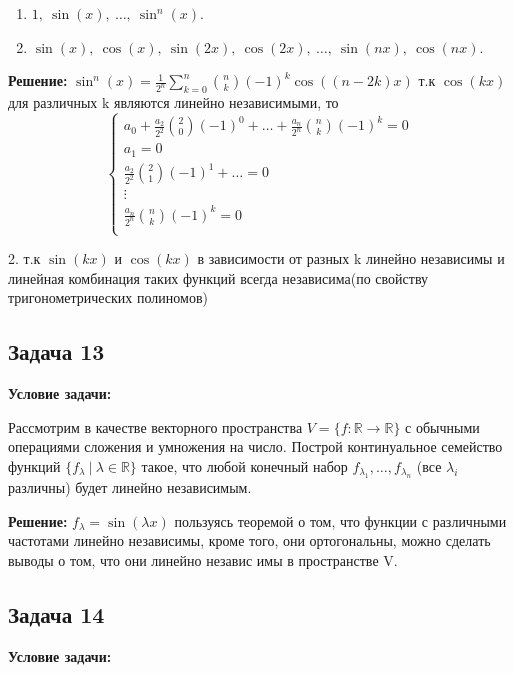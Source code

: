 \documentclass[a4paper,12pt]{article}
\begin{document}
\begin{enumerate}
    \item $1,\ \sin(x),\ \ldots,\ \sin^n(x)$.
    \item $\sin(x),\ \cos(x),\ \sin(2x),\ \cos(2x),\ \ldots,\ \sin(nx),\ \cos(nx)$.
\end{enumerate}
\textbf{Решение: }
$\sin^n(x) = \frac{1}{2^n} \sum_{k=0}^{n} \binom{n}{k} (-1)^k \cos\left((n - 2k)x\right)$
т.к $\cos(kx)$ для различных k являются линейно независимыми, то 
\[
\begin{cases}
a_0 + \frac{a_2}{2^2} \binom{2}{0} (-1)^0 + \ldots + \frac{a_n}{2^n} \binom{n}{k} (-1)^k = 0 \\
a_1 = 0 \\
\frac{a_2}{2^2} \binom{2}{1} (-1)^1 + \ldots = 0 \\
\vdots \\
\frac{a_n}{2^n} \binom{n}{k} (-1)^k = 0 \\
\end{cases}
\]

2. т.к $\sin(kx)$ и $\cos(kx)$ в зависимости от разных k линейно независимы и линейная комбинация таких функций всегда независима(по свойству тригонометрических полиномов)
\vspace{0.5cm}

\subsection{Задача 13}

\textbf{Условие задачи:}

Рассмотрим в качестве векторного пространства $V = \{f : \mathbb{R} \rightarrow \mathbb{R}\}$ с обычными операциями сложения и умножения на число. Построй континуальное семейство функций $\{f_\lambda\ |\ \lambda \in \mathbb{R}\}$ такое, что любой конечный набор $f_{\lambda_1},\ldots,f_{\lambda_n}$ (все $\lambda_i$ различны) будет линейно независимым.

\textbf{Решение: }
$f_\lambda=\sin(\lambda x)$ пользуясь теоремой о том, что функции с различными частотами линейно независимы, кроме того, они ортогональны, можно сделать выводы о том, что они линейно независ имы в пространстве V.
\vspace{0.5cm}

\subsection{Задача 14}

\textbf{Условие задачи:}
\end{document}
